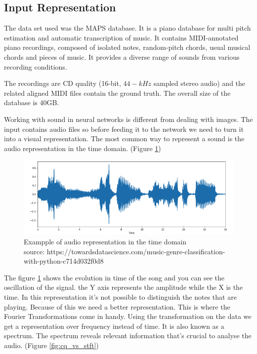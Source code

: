 \subsection{Input Representation}
The data set used was the MAPS database. It is a piano database for multi pitch estimation and automatic transcription of music. It contains MIDI-annotated piano recordings, composed of isolated notes, random-pitch chords, usual musical chords and pieces of music. It provides a diverse range of sounds from various recording conditions. \cite{maps}
\par
The recordings are CD quality (16-bit, $44-kHz$ sampled stereo audio) and the related aligned MIDI files contain the ground truth. The overall size of the database is 40GB. 
\par
Working with sound in neural networks is different from dealing with images. The input contains audio files so before feeding it to the network we need to turn it into a visual representation. The most common way to represent a sound is the audio representation in the time domain. (Figure \ref{fig:waveform})

\begin{figure}[h]
	\caption[Exampple of audio representation in the time domain]{ Exampple of audio representation in the time domain \\
		source: https://towardsdatascience.com/music-genre-classification-with-python-c714d032f0d8 }
	\centering
	\label{fig:waveform}
	\includegraphics[width=1\textwidth, height=\textheight, keepaspectratio]{"resources/waveform"}
\end{figure}

The figure \ref{fig:waveform} shows the evolution in time of the song and you can see the oscillation of the signal. the Y axis represents the amplitude while the X is the time. In this representation it's not possible to distinguish the notes that are playing. Because of this we need a better representation. This is where the Fourier Transformations come in handy. Using the transformation on the data we get a representation over frequency instead of time. It is also known as a spectrum. The spectrum reveals relevant information that's crucial to analyse the audio. (Figure \ref{fig:cq_vs_stft})

